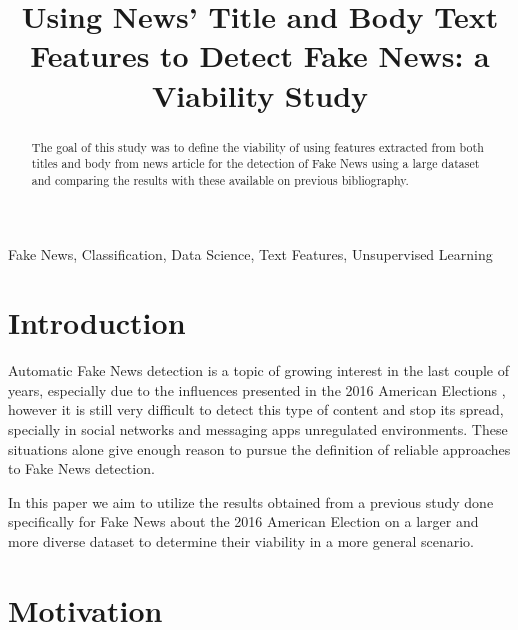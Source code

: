 \documentclass[conference]{IEEEtran}
\begin{document}
\title{ Using News' Title and Body Text Features to Detect Fake News: a Viability Study}


\author{
}

\maketitle

\begin{abstract}

The goal of this study was to define the viability of using features extracted from both titles 
and body from news article for the detection of Fake News using a large dataset and comparing
the results with these available on previous bibliography. 
\end{abstract}

\begin{IEEEkeywords}
Fake News, Classification, Data Science, Text Features, Unsupervised Learning
\end{IEEEkeywords}

\section{Introduction}

Automatic Fake News detection is a topic of growing interest in the last couple of years,
especially due to the influences presented in the 2016 American Elections \cite{allcott_gentzkow_2017},
however it is still very difficult to detect this type of content and stop its spread,
specially in social networks and messaging apps unregulated environments. These situations
alone give enough reason to pursue the definition of reliable approaches to Fake News detection.

In this paper we aim to utilize the results obtained from a previous study done specifically for Fake News 
about the 2016 American Election \cite{horne_2017} on a larger and more diverse dataset to determine
their viability in a more general scenario.

\section{Motivation}
\end{document}
